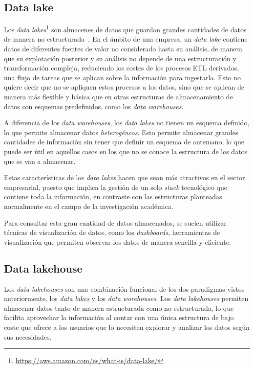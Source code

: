 \subsection{Data lake}\label{sec:lake}
Los \textit{data lakes}\footnote{
	\url{https://aws.amazon.com/es/what-is/data-lake/}
} son almacenes de datos que guardan grandes cantidades de datos de manera no
estructurada~\cite{mier2023dashboards}. En el ámbito de una empresa, un
\textit{data lake} contiene datos de diferentes fuentes de valor no considerado
hasta su análisis, de manera que su explotación posterior y su análisis no
depende de una estructuración y transformación compleja, reduciendo los costes
de los procesos ETL derivados, una flujo de tareas que se aplican sobre la
información para ingestarla. Esto no quiere decir que no se apliquen estos
procesos a los datos, sino que se aplican de manera más flexible y básica que en
otras estructuras de almacenamiento de datos con esquemas predefinidos, como los
\textit{data warehouses}.~\cite{pwint2018data}

A diferencia de los \textit{data warehouses}, los \textit{data lakes} no tienen
un esquema definido, lo que permite almacenar datos \textit{heterogéneos}. Esto
permite almacenar grandes cantidades de información sin tener que definir un
esquema de antemano, lo que puede ser útil en aquellos casos en los que no se
conoce la estructura de los datos que se van a almacenar.

Estas características de los \textit{data lakes} hacen que sean más atractivos
en el sector empresarial, puesto que implica la gestión de un solo \textit{stack}
tecnológico que contiene toda la información, en contraste con las estructuras
planteadas normalmente en el campo de la investigación académica.

Para consultar esta gran cantidad de datos almacenados, se suelen utilizar
técnicas de visualización de datos, como los \textit{dashboards}, herramientas
de visualización que permiten observar los datos de manera sencilla y eficiente.


\subsection{Data lakehouse}\label{sec:lakehouse}
Los \textit{data lakehouses} son una combinación funcional de los dos paradigmas
vistos anteriormente, los \textit{data lakes} y los \textit{data warehouses}.
Los \textit{data lakehouses} permiten almacenar datos tanto de manera
estructurada como no estructurada, lo que facilita aprovechar la información al
contar con una única estructura de bajo coste que ofrece a los usuarios que lo
necesiten explorar y analizar los datos según sus necesidades.


